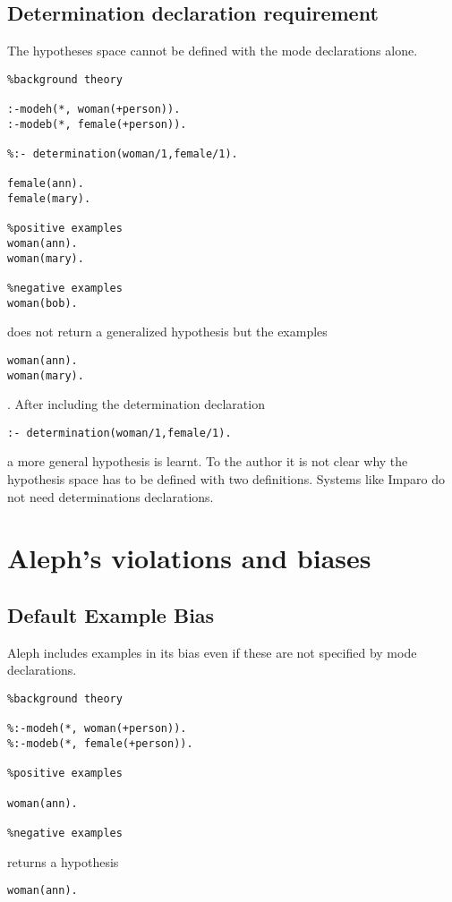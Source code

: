 \subsection{Determination declaration requirement}
The hypotheses space cannot be defined with the mode declarations alone.
\begin{lstlisting}
%background theory

:-modeh(*, woman(+person)).
:-modeb(*, female(+person)).

%:- determination(woman/1,female/1).

female(ann).
female(mary).

%positive examples
woman(ann).
woman(mary).

%negative examples
woman(bob).
\end{lstlisting}

does not return a generalized hypothesis but the examples
\begin{lstlisting}
woman(ann).
woman(mary).
\end{lstlisting}.
After including the determination declaration
\begin{lstlisting}
:- determination(woman/1,female/1).
\end{lstlisting}
a more general hypothesis  is learnt. To the author it is not clear why the hypothesis space has to be defined with two definitions. Systems like Imparo do not need determinations declarations.
\section{Aleph's violations and biases}

\subsection{Default Example Bias}
Aleph includes examples in its bias even if these are not specified by mode declarations.

\begin{lstlisting}
%background theory

%:-modeh(*, woman(+person)).
%:-modeb(*, female(+person)).

%positive examples

woman(ann).

%negative examples
\end{lstlisting}

returns a hypothesis
\begin{lstlisting}
woman(ann).
\end{lstlisting}

